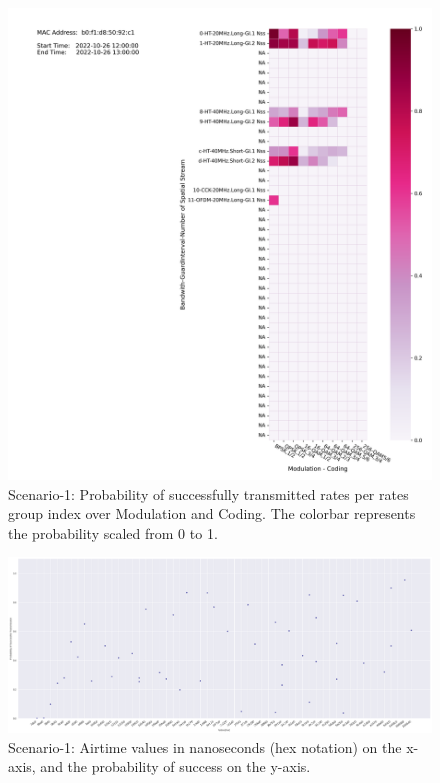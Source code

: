 \begin{figure}[hbt!]
  \centering
  \includegraphics[width=\textwidth]{figures/plots/Scenario-1/G1-heatmap-p-b0:f1:d8:50:92:c1-22-1652-351697.png}
  \caption[Probability of Success for Rate-Based Transmission]{Scenario-1: Probability of successfully transmitted rates per rates group index over Modulation and Coding. The colorbar represents the probability scaled from 0 to 1.}
  \label{fig:Success-probability1}
\end{figure}
\FloatBarrier 

\begin{landscape}
\begin{figure}[hbt!]
  \centering
  \includegraphics[width=1.45\textwidth, height=\textheight, keepaspectratio]{figures/plots/Scenario-1/G1-probability vs airtime-b0:f1:d8:50:92:c1-22-1652-351697.png}
  \caption[Airtime-Based Success Probability for Rate-Based Transmission]{Scenario-1: Airtime values in nanoseconds (hex notation) on the x-axis, and the probability of success on the y-axis.}
  \label{fig:Success-p-vs-airtime1}
\end{figure}
\FloatBarrier 
\end{landscape}

